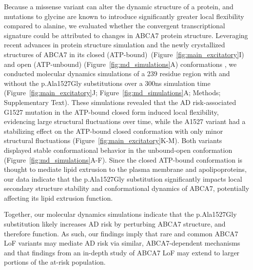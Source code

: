 Because a missense variant can alter the dynamic structure of a protein, and mutations to glycine are known to introduce significantly greater local flexibility compared to alanine, we evaluated whether the convergent transcriptional signature could be attributed to changes in ABCA7 protein structure. Leveraging recent advances in protein structure simulation and the newly crystallized structures of ABCA7 in its closed (ATP-bound)  (Figure~\ref{fig:main_excitatory}I) and open (ATP-unbound) (Figure~\ref{fig:md_simulations}A) conformations\cite{Le_Thi_My2022-dp,Jumper2021-na} , we conducted molecular dynamics simulations of a 239 residue region with and without the p.Ala1527Gly substitutions over a 300ns simulation time (Figure~\ref{fig:main_excitatory}J; Figure~\ref{fig:md_simulations}A; Methods; Supplementary Text). These simulations revealed that the AD risk-associated G1527 mutation in the ATP-bound closed form induced local flexibility, evidencing large structural fluctuations over time, while the A1527 variant had a stabilizing effect on the ATP-bound closed conformation with only minor structural fluctuations (Figure~\ref{fig:main_excitatory}K-M). Both variants displayed stable conformational behavior in the unbound-open conformation (Figure~\ref{fig:md_simulations}A-F). Since the closed ATP-bound conformation is thought to mediate lipid extrusion to the plasma membrane and apolipoproteins\cite{Le_Thi_My2022-dp}, our data indicate that the p.Ala1527Gly substitution significantly impacts local secondary structure  stability and conformational dynamics of ABCA7, potentially affecting its lipid extrusion function.  

Together, our molecular dynamics simulations indicate that the p.Ala1527Gly substitution likely increases AD risk by perturbing ABCA7 structure, and therefore function. As such, our findings imply that rare and common ABCA7 LoF variants may mediate AD risk via similar, ABCA7-dependent mechanisms  and that findings from an in-depth study of ABCA7 LoF may extend to larger portions of the at-risk population.

